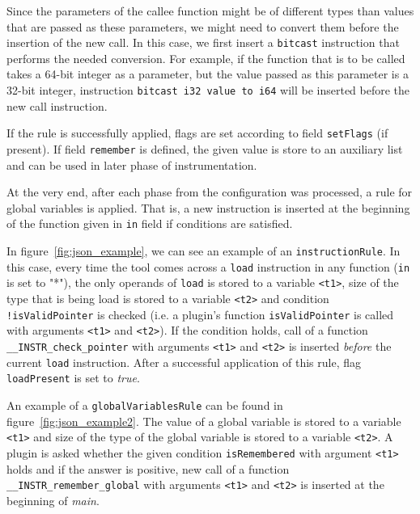 Since the parameters of the callee function might be of different types than
values that are passed as these parameters, we might need to convert them
before the insertion of the new call. In this case, we first insert a
\texttt{bitcast} instruction that performs the needed conversion. For example,
if the function that is to be called takes a 64-bit integer as a parameter, but
the value passed as this parameter is a 32-bit integer, instruction
\texttt{bitcast i32 value to i64} will be inserted before the new call
instruction.

If the rule is successfully applied, flags are set according to field
\texttt{setFlags} (if present). If field \texttt{remember} is defined, the
given value is store to an auxiliary list and can be used in later phase of
instrumentation.

At the very end, after each phase from the configuration was processed, a rule
for global variables is applied. That is, a new instruction is inserted at the
beginning of the function given in \texttt{in} field if conditions are
satisfied.


In figure~\ref{fig:json_example}, we can see an example of an
\texttt{instructionRule}. In this case, every time the tool comes across a
\texttt{load} instruction in any function (\texttt{in} is set to "*"), the only
operands of \texttt{load} is stored to a variable \texttt{<t1>}, size of the
type that is being load is stored to a variable \texttt{<t2>} and condition
\texttt{!isValidPointer} is checked (i.e. a plugin's function
\texttt{isValidPointer} is called with arguments \texttt{<t1>} and
\texttt{<t2>}). If the condition holds, call of a function
\texttt{\_\_INSTR\_check\_pointer} with arguments \texttt{<t1>} and
\texttt{<t2>} is inserted \emph{before} the current \texttt{load} instruction.
After a successful application of this rule, flag \texttt{loadPresent} is set
to \emph{true}.

An example of a \texttt{globalVariablesRule} can be found in
figure~\ref{fig:json_example2}. The value of a global variable is stored to a
variable \texttt{<t1>} and size of the type of the global variable is stored to
a variable \texttt{<t2>}. A plugin is asked whether the given condition
\texttt{isRemembered} with argument \texttt{<t1>} holds and if the answer is
positive, new call of a function \texttt{\_\_INSTR\_remember\_global} with
arguments \texttt{<t1>} and \texttt{<t2>} is inserted at the beginning of
\emph{main}.

